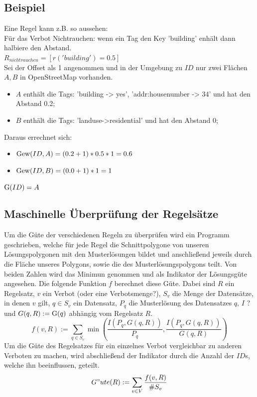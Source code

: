 \subsection{Beispiel}
Eine Regel kann z.B. so aussehen:\\
Für das Verbot Nichtrauchen: wenn ein Tag den Key 'building' enhält dann halbiere den Abstand. \\
$R_{nichtrauchen} = [r('building') = 0.5]$\\
\newline
Sei der Offset als 1 angenommen und in der Umgebung zu $ID$ nur zwei
Flächen $A,B$ in OpenStreetMap vorhanden.
\begin{itemize}
\item $A$ enthält die Tags: 'building -> yes', 'addr:housenumber -> 34' und hat den Abstand 0.2;
\item $B$ enthält die Tags: 'landuse->residential' und hat den Abstand 0;
\end{itemize}
Daraus errechnet sich:
\begin{itemize}
\item $\operatorname{Gew}(ID,A) = (0.2 + 1) * 0.5 * 1 = 0.6$
\item $\operatorname{Gew}(ID,B) = (0.0 + 1) * 1 = 1$
\end{itemize}

$\operatorname{G}(ID) = A$

\subsection{Maschinelle Überprüfung der Regelsätze}
Um die Güte der verschiedenen Regeln zu überprüfen wird ein Programm geschrieben, welche für jede Regel die Schnittpolygone von unseren Lösungspolygonen mit
den Musterlösungen bildet und anschließend jeweils durch die Fläche unseres Polygons, sowie die des Musterlösungspolygons teilt.
Von beiden Zahlen wird das Minimun genommen und als Indikator der Lösungsgüte angesehen. Die folgende Funktion $f$ berechnet diese Güte.
Dabei sind $R$ ein Regelsatz, $v$ ein Verbot (oder eine Verbotsmenge?), $S_v$ die Menge der Datensätze, in denen $v$ gilt,
$q\in S_v$ ein Datensatz, $P_q$ die Musterlösung des Datensatzes $q$, $I$ ? und $G(q,R):=\operatorname{G}(q)$ abhängig vom Regelsatz $R$.\\
\begin{equation}
f(v,R) := \sum_{q\in S_v} \min \left(\frac{I(P_q,G(q,R))}{P_q},\frac{I(P_q,G(q,R))}{G(q,R)}\right)
\end{equation}
Um die Güte des Regelsatzes für ein einzelnes Verbot vergleichbar zu anderen Verboten zu machen, wird abschließend der Indikator durch
die Anzahl der $ID$s, welche ihn beeinflussen, geteilt.\\
\begin{equation}
\label{eq:guete}
G"ute(R) := \sum_{v \in V} \frac{ f(v,R)}{\#S_v}
\end{equation}

